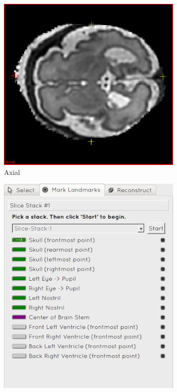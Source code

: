 \begin{figure}[H]
  \centering
  \begin{subfigure}[b]{0.559\textwidth}
    \includegraphics[width=\textwidth]{images/reconstruction/axial.png}
    \caption*{Axial}
    \label{fig:reconstructionaxial}
  \end{subfigure}%
  \begin{subfigure}[b]{0.441\textwidth}
    \includegraphics[width=\textwidth]{images/reconstruction/controls.png}

\end{subfigure}
\end{figure}
